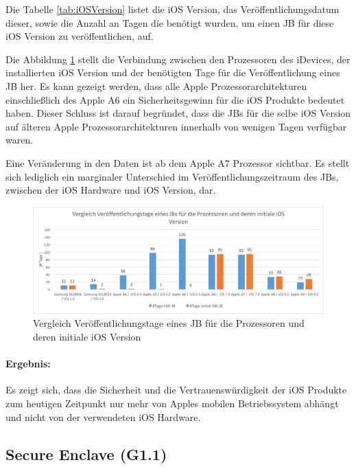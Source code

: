 Die Tabelle \ref{tab:iOSVersion} listet die iOS Version, das Veröffentlichungsdatum dieser, sowie die Anzahl an Tagen die benötigt wurden, um einen JB für diese iOS Version zu veröffentlichen, auf.  \par 
Die Abbildung \ref{fig:VergleichJBProzessorSW} stellt die Verbindung zwischen den Prozessoren des iDevices, der installierten iOS Version und der benötigten Tage für die Veröffentlichung eines JB her. Es kann gezeigt werden, dass alle Apple Prozessorarchitekturen einschließlich des Apple A6 ein Sicherheitsgewinn für die iOS Produkte bedeutet haben. Dieser Schluss ist darauf begründet, dass die JBs für die selbe iOS Version auf älteren Apple Prozessorarchitekturen innerhalb von wenigen Tagen verfügbar waren. \par 

Eine Veränderung in den Daten ist ab dem Apple A7 Prozessor sichtbar. Es stellt sich lediglich ein marginaler Unterschied im Veröffentlichungszeitraum des JBs, zwischen der iOS Hardware und iOS Version, dar.

\newpage
\begin{figure}[htbp!]
        \centering
                \includegraphics[scale=0.5]{Bilder/iDeviceJB-SW-HW.png}
         \caption{Vergleich Veröffentlichungstage eines JB für die Prozessoren und deren initiale iOS Version \protect\footnotemark}
        \label{fig:VergleichJBProzessorSW}      
\end{figure}

\paragraph{Ergebnis:} Es zeigt sich, dass die Sicherheit und die Vertrauenswürdigkeit der iOS Produkte zum heutigen Zeitpunkt nur mehr von Apples mobilen Betriebssystem abhängt und nicht von der verwendeten iOS Hardware. 
%
\subsection{Secure Enclave  (G1.1)}
\label{sec:Frage1SecureEnclave}
 
